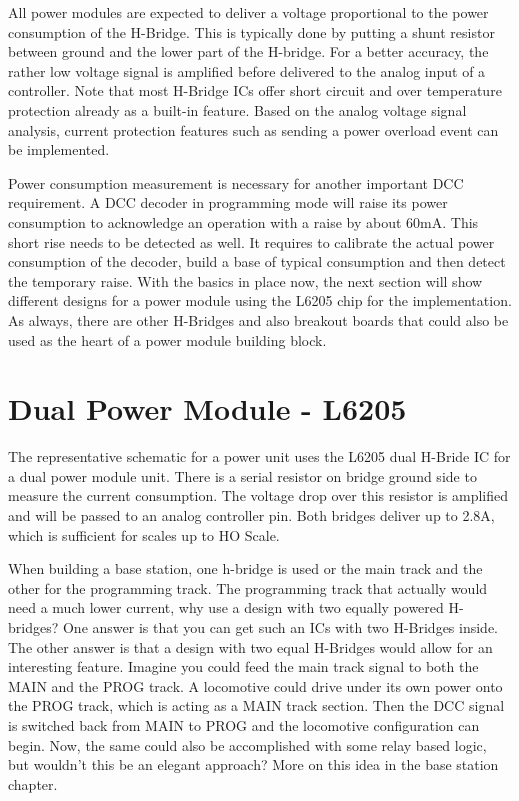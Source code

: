 All power modules are expected to deliver a voltage proportional to the power consumption of the H-Bridge. This is typically done by putting a shunt resistor between ground and the lower part of the H-bridge. For a better accuracy, the rather low voltage signal is amplified before delivered to the analog input of a controller. Note that most H-Bridge ICs offer short circuit and over temperature protection already as a built-in feature. Based on the analog voltage signal analysis, current protection features such as sending a power overload event can be implemented.

Power consumption measurement is necessary for another important DCC requirement. A DCC decoder in programming mode will raise its power consumption to acknowledge an operation with a raise by about 60mA. This short rise needs to be detected as well. It requires to calibrate the actual power consumption of the decoder, build a base of typical consumption and then detect the temporary raise. With the basics in place now, the next section will show different designs for a power module using the L6205 chip for the implementation. As always, there are other H-Bridges and also breakout boards that could also be used as the heart of a power module building block.

\section{Dual Power Module - L6205}

The representative schematic for a power unit uses the L6205 dual H-Bride IC for a dual power module unit. There is a serial resistor on bridge ground side to measure the current consumption. The voltage drop over this resistor is amplified and will be passed to an analog controller pin. Both bridges deliver up to 2.8A, which is sufficient for scales up to HO Scale.


When building a base station, one h-bridge is used or the main track and the other for the programming track. The programming track that actually would need a much lower current, why use a design with two equally powered H-bridges? One answer is that you can get such an ICs with two H-Bridges inside. The other answer is that a design with two equal H-Bridges would allow for an interesting feature. Imagine you could feed the main track signal to both the MAIN and the PROG track. A locomotive could drive under its own power onto the PROG track, which is acting as a MAIN track section. Then the DCC signal is switched back from MAIN to PROG and the locomotive configuration can begin. Now, the same could also be accomplished with some relay based logic, but wouldn't this be an elegant approach? More on this idea in the base station chapter.

